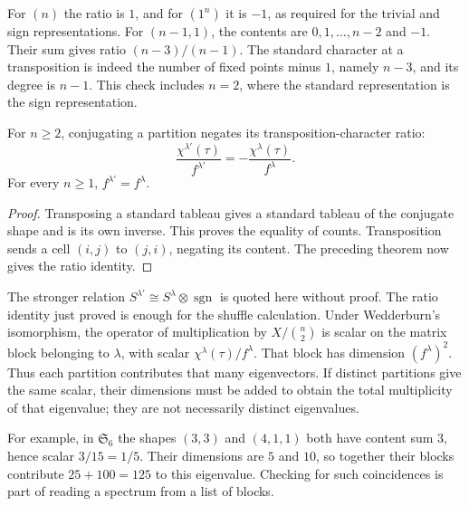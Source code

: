For $(n)$ the ratio is $1$, and for $(1^n)$ it is $-1$, as required for the trivial and sign representations. For $(n-1,1)$, the contents are $0,1,\ldots,n-2$ and $-1$. Their sum gives ratio $(n-3)/(n-1)$. The standard character at a transposition is indeed the number of fixed points minus $1$, namely $n-3$, and its degree is $n-1$. This check includes $n=2$, where the standard representation is the sign representation.

\begin{corollary}\label{cor:conjugate}
For $n\ge2$, conjugating a partition negates its transposition-character ratio:
\[
\frac{\chi^{\lambda'}(\tau)}{f^{\lambda'}}
=-\frac{\chi^\lambda(\tau)}{f^\lambda}.
\]
For every $n\ge1$, $f^{\lambda'}=f^\lambda$.
\end{corollary}

\begin{proof}
Transposing a standard tableau gives a standard tableau of the conjugate shape and is its own inverse. This proves the equality of counts. Transposition sends a cell $(i,j)$ to $(j,i)$, negating its content. The preceding theorem now gives the ratio identity.
\end{proof}

The stronger relation $S^{\lambda'}\cong S^\lambda\otimes\operatorname{sgn}$ is quoted here without proof. The ratio identity just proved is enough for the shuffle calculation. Under Wedderburn's isomorphism, the operator of multiplication by $X/\binom n2$ is scalar on the matrix block belonging to $\lambda$, with scalar $\chi^\lambda(\tau)/f^\lambda$. That block has dimension $(f^\lambda)^2$. Thus each partition contributes that many eigenvectors. If distinct partitions give the same scalar, their dimensions must be added to obtain the total multiplicity of that eigenvalue; they are not necessarily distinct eigenvalues.

For example, in $\mathfrak S_6$ the shapes $(3,3)$ and $(4,1,1)$ both have content sum $3$, hence scalar $3/15=1/5$. Their dimensions are $5$ and $10$, so together their blocks contribute $25+100=125$ to this eigenvalue. Checking for such coincidences is part of reading a spectrum from a list of blocks.

